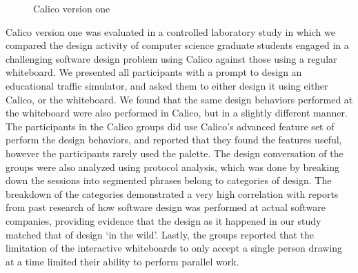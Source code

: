 \begin{figure}
  \centering
   \caption {Calico version one}
   \label{fig:calico-version-one}
\end{figure}

Calico version one was evaluated in a controlled laboratory study in which we compared the design activity of computer science graduate students engaged in a challenging software design problem using Calico against those using a regular whiteboard. We presented all participants with a prompt to design an educational traffic simulator, and asked them to either design it using either Calico, or the whiteboard. We found that the same design behaviors performed at the whiteboard were also performed in Calico, but in a slightly different manner. The participants in the Calico groups did use Calico's advanced feature set of perform the design behaviors, and reported that they found the features useful, however the participants rarely used the palette. The design conversation of the groups were also analyzed using protocol analysis, which was done by breaking down the sessions into segmented phrases belong to categories of design. The breakdown of the categories demonstrated a very high correlation with reports from past research of how software design was performed at actual software companies, providing evidence that the design as it happened in our study matched that of design `in the wild'. Lastly, the groups reported that the limitation of the interactive whiteboards to only accept a single person drawing at a time limited their ability to perform parallel work.

